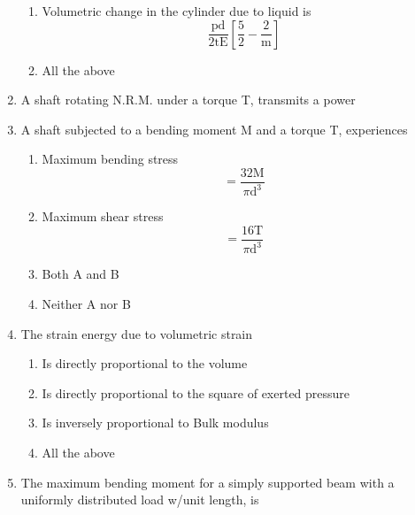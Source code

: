 \documentclass[11pt,a4paper]{article}
\begin{document}
\begin{enumerate}
\begin{enumerate}[label=\Alph*.]
\item{Volumetric change in the cylinder due to liquid is $$\frac{{{\text{pd}}}}{{2{\text{tE}}}}\left[ {\frac{5}{2} - \frac{2}{{\text{m}}}} \right]$$}
\item{All the above}
\end{enumerate}
\item{A shaft rotating N.R.M. under a torque T, transmits a power}
\\
\item{A shaft subjected to a bending moment M and a torque T, experiences}
\begin{enumerate}[label=\Alph*.]
\item{Maximum bending stress $$ = \frac{{32{\text{M}}}}{{\pi {{\text{d}}^3}}}$$}
\item{Maximum shear stress $$ = \frac{{16{\text{T}}}}{{\pi {{\text{d}}^3}}}$$}
\item{Both A and B}
\item{Neither A nor B}
\end{enumerate}
\item{The strain energy due to volumetric strain}
\begin{enumerate}[label=\Alph*.]
\item{Is directly proportional to the volume}
\item{Is directly proportional to the square of exerted pressure}
\item{Is inversely proportional to Bulk modulus}
\item{All the above}
\end{enumerate}
\item{The maximum bending moment for a simply supported beam with a uniformly distributed load w/unit length, is}
\\
\end{enumerate}
\end{document}
